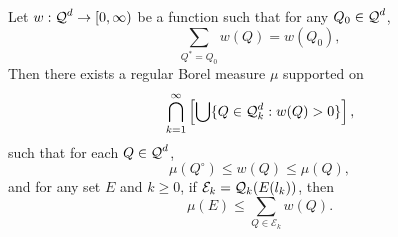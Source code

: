 \begin{theorem} \label{massdistributionprinciplelem}
	Let $w: \operatorname{\mathcal{Q}}^d \to [0,\infty)$ be a function such that for any $Q_0 \in \operatorname{\mathcal{Q}}^d$,
	\begin{equation} \label{equation73234091} \sum_{Q^* = Q_0} w(Q) = w(Q_0), \end{equation}
	Then there exists a regular Borel measure $\mu$ supported on
	\[ \bigcap_{k = 1}^\infty \left[ \bigcup \{ Q \in \operatorname{\mathcal{Q}}_k^d : w(Q) > 0 \} \right], \]
	such that for each $Q \in \operatorname{\mathcal{Q}}^d$,
	\begin{equation} \label{massdissupperbound} \mu(Q^\circ) \leq w(Q) \leq \mu(Q), \end{equation}
	and for any set $E$ and $k \geq 0$, if $\mathcal{E}_k = \operatorname{\mathcal{Q}}_k(E(l_k))$, then
	\begin{equation} \label{massdisslowerbound} \mu(E) \leq \sum_{Q \in \mathcal{E}_k} w(Q). \end{equation}
\end{theorem}
